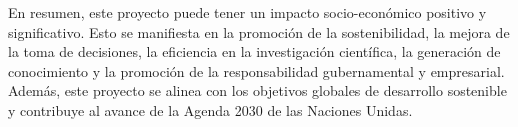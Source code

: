 En resumen, este proyecto puede tener un impacto socio-económico positivo y
significativo. Esto se manifiesta en la promoción de la sostenibilidad, la
mejora de la toma de decisiones, la eficiencia en la investigación científica,
la generación de conocimiento y la promoción de la responsabilidad gubernamental
y empresarial. Además, este proyecto se alinea con los objetivos globales de
desarrollo sostenible y contribuye al avance de la Agenda 2030 de las Naciones
Unidas.

